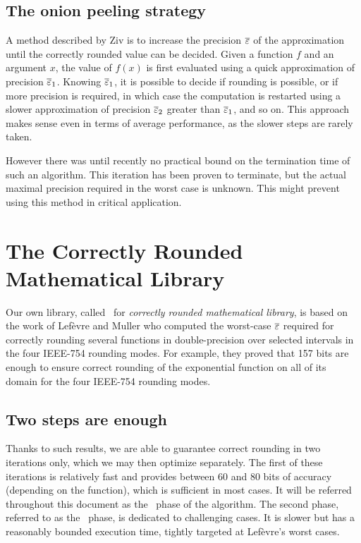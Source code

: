 \subsection{The onion peeling strategy}

A method described by Ziv \cite{Ziv91} is to increase the precision
${\overline{\varepsilon}}$ of the approximation until the correctly rounded value can
be decided.  Given a function $f$ and an argument $x$, the value of
$f(x)$ is first evaluated using a quick approximation of precision
${\overline{\varepsilon}}_1$.  Knowing ${\overline{\varepsilon}}_1$, it is possible to decide if
rounding is possible, or if more precision is required, in which case
the computation is restarted using a slower approximation of precision
${\overline{\varepsilon}}_2$ greater than ${\overline{\varepsilon}}_1$, and so on. This approach makes
sense even in terms of average performance, as the slower steps are
rarely taken.

However there was until recently no practical bound on the termination
time of such an algorithm. This iteration has been proven to
terminate, but the actual maximal precision required in the worst case
is unknown.  This might prevent using this method in critical
application.




\section{The Correctly Rounded Mathematical Library}
\label{section:crlibm}

Our own library, called \crlibm\ for \emph{correctly rounded
  mathematical library}, is based on the work of
Lef\`evre and Muller \cite{LMT98,Lef2000} who computed the worst-case ${\overline{\varepsilon}}$
required for correctly rounding several functions in double-precision
over selected intervals in the four IEEE-754 rounding modes. For
example, they proved that 157 bits are enough to ensure correct rounding
of the exponential function on all of its domain for the four IEEE-754
rounding modes.

\subsection{Two steps are enough}
Thanks to such results, we are able to guarantee correct rounding in
two iterations only, which we may then optimize separately. The first
of these iterations is relatively fast and provides between 60 and 80
bits of accuracy (depending on the function), which is sufficient in
most cases. It will be referred throughout this document as the \quick\ 
phase of the algorithm. The second phase, referred to as the
\accurate\ phase, is dedicated to challenging cases. It is slower but
has a reasonably bounded execution time, tightly targeted at
Lef\`evre's worst cases.

